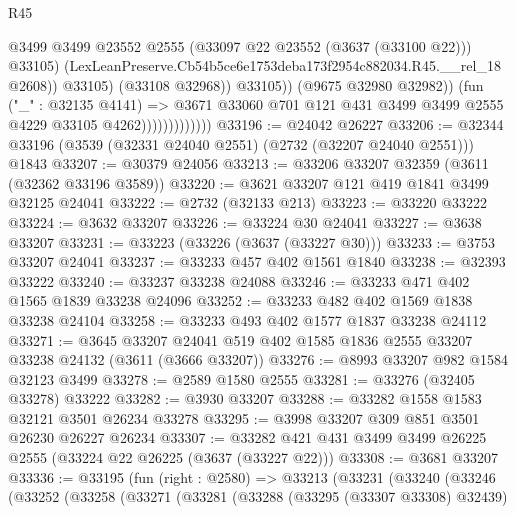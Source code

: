 \begin{lexlean}{R45}
\begin{coremodule}
                                          @3499
                                          @3499
                                          @23552
                                          @2555
                                          (@33097 @22 @23552 (@3637 (@33100 @22)))
                                          @33105)
                                        (LexLeanPreserve.Cb54b5ce6e1753deba173f2954c882034.R45.__rel_18
                                          @2608))
                                      @33105)
                                    (@33108 @32968))
                                  @33105))
                              (@9675 @32980 @32982))
                            (fun ("_" : @32135 @4141) =>
                            @3671
                              @33060
                              @701
                              @121
                              @431
                              @3499
                              @3499
                              @2555
                              @4229
                              @33105
                              @4262)))))))))))))
@33196 := @24042 @26227
@33206 := @32344 @33196 (@3539 (@32331 @24040 @2551) (@2732 (@32207 @24040 @2551))) @1843
@33207 := @30379 @24056
@33213 := @33206 @33207 @32359 (@3611 (@32362 @33196 @3589))
@33220 := @3621 @33207 @121 @419 @1841 @3499 @32125 @24041
@33222 := @2732 (@32133 @213)
@33223 := @33220 @33222
@33224 := @3632 @33207
@33226 := @33224 @30 @24041
@33227 := @3638 @33207
@33231 := @33223 (@33226 (@3637 (@33227 @30)))
@33233 := @3753 @33207 @24041
@33237 := @33233 @457 @402 @1561 @1840
@33238 := @32393 @33222
@33240 := @33237 @33238 @24088
@33246 := @33233 @471 @402 @1565 @1839 @33238 @24096
@33252 := @33233 @482 @402 @1569 @1838 @33238 @24104
@33258 := @33233 @493 @402 @1577 @1837 @33238 @24112
@33271 := @3645
    @33207
    @24041
    @519
    @402
    @1585
    @1836
    @2555
    @33207
    @33238
    @24132
    (@3611 (@3666 @33207))
@33276 := @8993 @33207 @982 @1584 @32123 @3499
@33278 := @2589 @1580 @2555
@33281 := @33276 (@32405 @33278) @33222
@33282 := @3930 @33207
@33288 := @33282 @1558 @1583 @32121 @3501 @26234 @33278
@33295 := @3998 @33207 @309 @851 @3501 @26230 @26227 @26234
@33307 := @33282 @421 @431 @3499 @3499 @26225 @2555 (@33224 @22 @26225 (@3637 (@33227 @22)))
@33308 := @3681 @33207
@33336 := @33195
    (fun (right : @2580) =>
    @33213
      (@33231
        (@33240
          (@33246
            (@33252
              (@33258
                (@33271
                  (@33281
                    (@33288
                      (@33295 (@33307 @33308) @32439)

\end{coremodule}
\end{lexlean}
